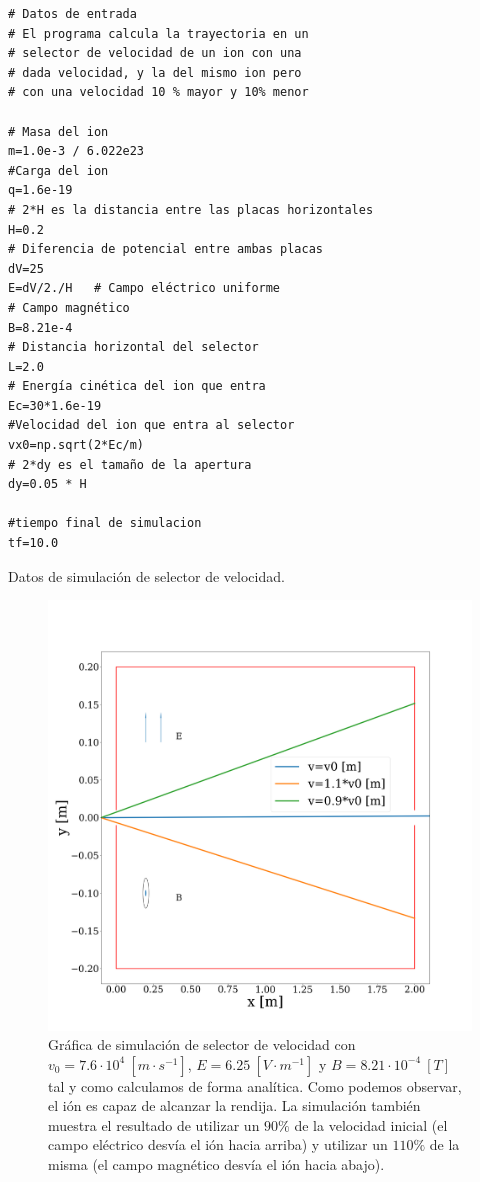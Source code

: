 \documentclass[journal]{IEEEtran}
\newenvironment{code}{\captionsetup{type=listing}}{\par\addvspace{\baselineskip}}
\begin{document}
\begin{code}
    \begin{verbatim}
# Datos de entrada
# El programa calcula la trayectoria en un
# selector de velocidad de un ion con una
# dada velocidad, y la del mismo ion pero
# con una velocidad 10 % mayor y 10% menor

# Masa del ion
m=1.0e-3 / 6.022e23  
#Carga del ion
q=1.6e-19   
# 2*H es la distancia entre las placas horizontales
H=0.2
# Diferencia de potencial entre ambas placas  
dV=25     
E=dV/2./H   # Campo eléctrico uniforme
# Campo magnético
B=8.21e-4  
# Distancia horizontal del selector
L=2.0  
# Energía cinética del ion que entra
Ec=30*1.6e-19  
#Velocidad del ion que entra al selector
vx0=np.sqrt(2*Ec/m)  
# 2*dy es el tamaño de la apertura
dy=0.05 * H 

#tiempo final de simulacion
tf=10.0           
    \end{verbatim}
    \caption{Datos de simulación de selector de velocidad.}
    \label{listing:datos_selector}
\end{code}

\begin{figure}[!htb]
    \includegraphics[width=\linewidth]{selector_simulacion}
    \caption{Gráfica de simulación de selector de velocidad con $v_0 = 7.6\cdot 10^4~[m\cdot s^{-1}]$, $E = 6.25~[V\cdot m^{-1}]$ y $B = 8.21\cdot 10^{-4}~[T]$ tal y como calculamos de forma analítica. Como podemos observar, el ión es capaz de alcanzar la rendija. La simulación también muestra el resultado de utilizar un $90\%$ de la velocidad inicial (el campo eléctrico desvía el ión hacia arriba) y utilizar un $110\%$ de la misma (el campo magnético desvía el ión hacia abajo).}
    \label{fig:selector_simulacion}
\end{figure}
\end{document}
